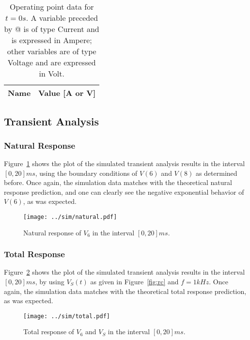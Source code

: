 \begin{table}[h]
  \centering
  \begin{tabular}{|l|r|}
    \hline    
    {\bf Name} & {\bf Value [A or V]} \\ \hline
    
  \end{tabular}
  \caption{Operating point data for $t=0 s$. A variable preceded by @ is of type Current and is expressed in Ampere; other variables are of type Voltage and are expressed in Volt.}
  \label{tab:op2}
\end{table}
            



\subsection{Transient Analysis}

\subsubsection{Natural Response}

Figure~\ref{fig:trans} shows the plot of the simulated transient analysis results in the interval $[0, 20] ms$, using the boundary conditions of $V(6)$ and $V(8)$ as determined before. 
Once again, the simulation data matches with the theoretical natural response prediction, and one can clearly see the negative exponential behavior of $V(6)$, as was expected.


\begin{figure}[h] \centering
\texttt{[image: ../sim/natural.pdf]}
\caption{Natural response of $V_{6}$ in the interval $[0, 20] ms$.}
\label{fig:trans}
\end{figure}

\subsubsection{Total Response}

Figure~\ref{fig:totalsim} shows the plot of the simulated transient analysis results in the interval $[0, 20] ms$, by using $V_S(t)$ as given in Figure~\ref{fig:rc} and $f = 1 kHz$. 
Once again, the simulation data matches with the theoretical total response prediction, as was expected.
                                    

\begin{figure}[h] \centering
\texttt{[image: ../sim/total.pdf]}
\caption{Total response of $V_{6}$ and $V_S$ in the interval $[0, 20] ms$.}
\label{fig:totalsim}
\end{figure}



